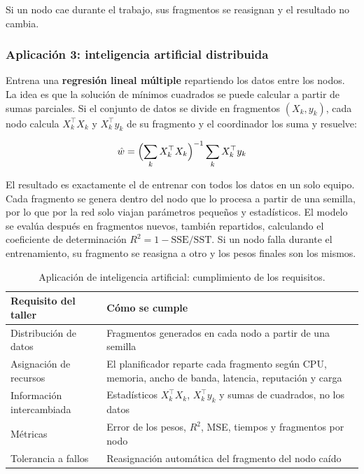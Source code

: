 \documentclass{article}
\begin{document}
Si un nodo cae durante el trabajo, sus fragmentos se reasignan y el resultado no cambia.

\subsubsection{Aplicación 3: inteligencia artificial distribuida}

Entrena una \textbf{regresión lineal múltiple} repartiendo los datos entre los nodos. La idea es que
la solución de mínimos cuadrados se puede calcular a partir de sumas parciales. Si el conjunto de
datos se divide en fragmentos $(X_k, y_k)$, cada nodo calcula $X_k^{\top}X_k$ y $X_k^{\top}y_k$ de su
fragmento y el coordinador los suma y resuelve:

\begin{equation}
\hat{w} = \Bigl(\sum_k X_k^{\top}X_k\Bigr)^{-1} \sum_k X_k^{\top}y_k
\end{equation}

El resultado es exactamente el de entrenar con todos los datos en un solo equipo. Cada fragmento se
genera dentro del nodo que lo procesa a partir de una semilla, por lo que por la red solo viajan
parámetros pequeños y estadísticos. El modelo se evalúa después en fragmentos nuevos, también
repartidos, calculando el coeficiente de determinación
$R^2 = 1 - \mathrm{SSE}/\mathrm{SST}$. Si un nodo falla durante el entrenamiento, su fragmento se
reasigna a otro y los pesos finales son los mismos.

\begin{table}[htbp]
\centering
\small
\begin{tabular}{|p{}|p{}|}
\hline
\textbf{Requisito del taller} & \textbf{Cómo se cumple} \\ \hline
Distribución de datos & Fragmentos generados en cada nodo a partir de una semilla \\ \hline
Asignación de recursos & El planificador reparte cada fragmento según CPU, memoria, ancho de banda, latencia, reputación y carga \\ \hline
Información intercambiada & Estadísticos $X_k^{\top}X_k$, $X_k^{\top}y_k$ y sumas de cuadrados, no los datos \\ \hline
Métricas & Error de los pesos, $R^2$, MSE, tiempos y fragmentos por nodo \\ \hline
Tolerancia a fallos & Reasignación automática del fragmento del nodo caído \\ \hline
\end{tabular}
\caption{Aplicación de inteligencia artificial: cumplimiento de los requisitos.}
\label{tab:ia}
\end{table}
\end{document}
